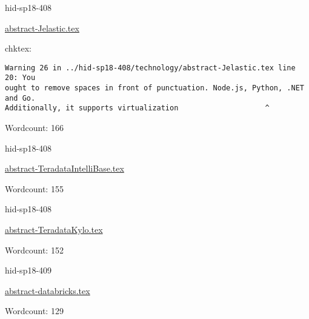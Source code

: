

\begin{IU}

hid-sp18-408

\href{https://github.com/cloudmesh-community/hid-sp18-408/blob/master//technology/abstract-Jelastic.tex}{abstract-Jelastic.tex}

 
chktex:
\begin{tiny}
\begin{verbatim}
Warning 26 in ../hid-sp18-408/technology/abstract-Jelastic.tex line 20: You
ought to remove spaces in front of punctuation. Node.js, Python, .NET and Go.
Additionally, it supports virtualization                    ^
\end{verbatim}
\end{tiny}

Wordcount: 166

\end{IU}



\begin{IU}

hid-sp18-408

\href{https://github.com/cloudmesh-community/hid-sp18-408/blob/master//technology/abstract-TeradataIntelliBase.tex}{abstract-TeradataIntelliBase.tex}

 

Wordcount: 155

\end{IU}



\begin{IU}

hid-sp18-408

\href{https://github.com/cloudmesh-community/hid-sp18-408/blob/master//technology/abstract-TeradataKylo.tex}{abstract-TeradataKylo.tex}

 

Wordcount: 152

\end{IU}



\begin{IU}

hid-sp18-409

\href{https://github.com/cloudmesh-community/hid-sp18-409/blob/master//technology/abstract-databricks.tex}{abstract-databricks.tex}

 

Wordcount: 129

\end{IU}

